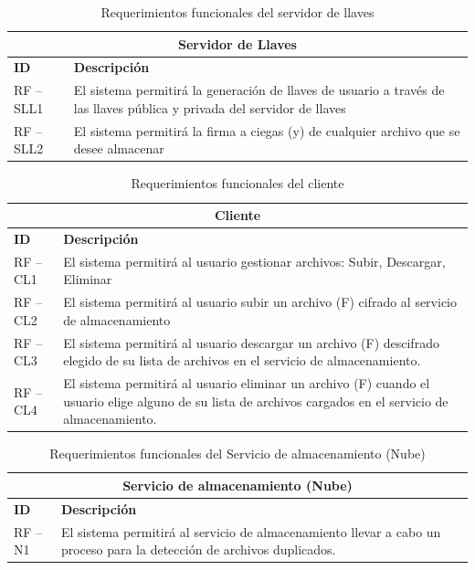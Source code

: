 \begin{table}[htb]
\centering
\begin{tabular}{| p{2cm} | p{13.5cm} |}
\hline
\multicolumn{2}{|c|}{\textbf{Servidor de Llaves}} \\ \hline
\textbf{ID} & \textbf{Descripción} \\
\hline \hline
RF – SLL1 &El sistema permitirá la generación de llaves de usuario a través de las llaves pública y privada del servidor de llaves \\ \hline
RF – SLL2 & El sistema permitirá la firma a ciegas (y) de cualquier archivo que se desee almacenar\\ \hline
\end{tabular}
\caption{Requerimientos funcionales del servidor de llaves}
\label{Servidor de Llaves }
\end{table}


\begin{table}[htb]
\centering
\begin{tabular}{| p{2cm} | p{13.5cm} |}
\hline
\multicolumn{2}{|c|}{\textbf{Cliente}} \\ \hline
\textbf{ID} & \textbf{Descripción} \\
\hline \hline
RF – CL1 & El sistema permitirá al usuario gestionar archivos: Subir, Descargar, Eliminar \\ \hline
RF – CL2 & El sistema permitirá al usuario subir un archivo (F) cifrado al servicio de almacenamiento \\ \hline
RF – CL3 & El sistema permitirá al usuario descargar un archivo (F) descifrado elegido de su lista de archivos en el servicio de almacenamiento. \\ \hline
RF – CL4 &El sistema permitirá al usuario eliminar un archivo (F) cuando el usuario elige alguno de su lista de archivos cargados en el servicio de almacenamiento. \\ \hline
\end{tabular}
\caption{Requerimientos funcionales del cliente}
\label{Cliente }
\end{table}


\begin{table}[htb]
\centering
\begin{tabular}{| p{2cm} | p{13.5cm} |}
\hline
\multicolumn{2}{|c|}{\textbf{Servicio de almacenamiento (Nube)}} \\ \hline
\textbf{ID} & \textbf{Descripción} \\
\hline \hline

RF – N1 & El sistema permitirá al servicio de almacenamiento llevar a cabo un proceso para la detección de archivos duplicados. \\ \hline

\end{tabular}
\caption{Requerimientos funcionales del Servicio de almacenamiento (Nube)}
\label{Servicio de almacenamiento (Nube) }
\end{table}
\vspace{9cm}

